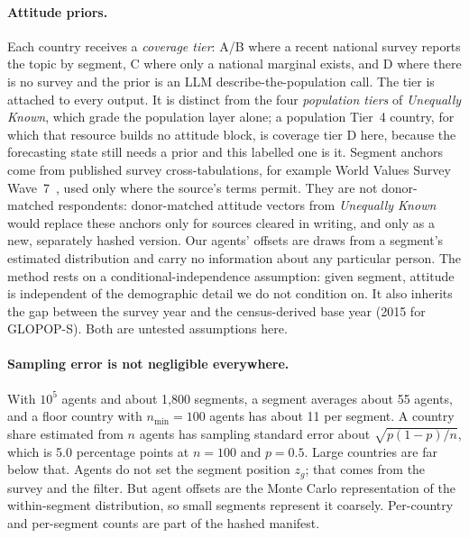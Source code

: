 \documentclass[11pt]{article}
\begin{document}
\paragraph{Attitude priors.} Each country receives a \emph{coverage tier}: A/B where a recent national survey reports the topic by segment, C where only a national marginal exists, and D where there is no survey and the prior is an LLM describe-the-population call. The tier is attached to every output. It is distinct from the four \emph{population tiers} of \emph{Unequally Known}, which grade the population layer alone; a population Tier~4 country, for which that resource builds no attitude block, is coverage tier D here, because the forecasting state still needs a prior and this labelled one is it. Segment anchors come from published survey cross-tabulations, for example World Values Survey Wave~7~\citep{wvs7}, used only where the source's terms permit. They are not donor-matched respondents: donor-matched attitude vectors from \emph{Unequally Known} would replace these anchors only for sources cleared in writing, and only as a new, separately hashed version. Our agents' offsets are draws from a segment's estimated distribution and carry no information about any particular person. The method rests on a conditional-independence assumption: given segment, attitude is independent of the demographic detail we do not condition on. It also inherits the gap between the survey year and the census-derived base year (2015 for GLOPOP-S). Both are untested assumptions here.

\paragraph{Sampling error is not negligible everywhere.} With $10^5$ agents and about 1,800 segments, a segment averages about 55 agents, and a floor country with $n_{\min}=100$ agents has about 11 per segment. A country share estimated from $n$ agents has sampling standard error about $\sqrt{p(1-p)/n}$, which is 5.0 percentage points at $n=100$ and $p=0.5$. Large countries are far below that. Agents do not set the segment position $z_g$; that comes from the survey and the filter. But agent offsets are the Monte Carlo representation of the within-segment distribution, so small segments represent it coarsely. Per-country and per-segment counts are part of the hashed manifest.
\end{document}
